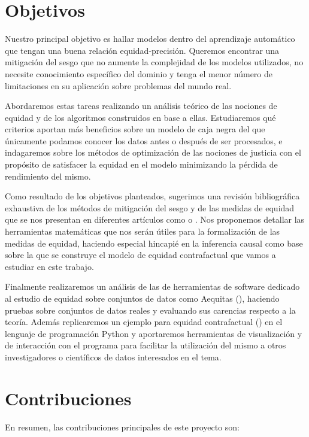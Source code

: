 \documentclass[oneside,openright,titlepage,numbers=noenddot,openany,headinclude,footinclude=true,
cleardoublepage=empty,abstractoff,BCOR=5mm,paper=a4,fontsize=12pt,main=spanish]{scrreprt}
\begin{document}
\section{Objetivos}

Nuestro principal objetivo es hallar modelos dentro del aprendizaje automático que tengan una buena relación equidad-precisión. Queremos encontrar una mitigación del sesgo que no aumente la complejidad de los modelos utilizados, no necesite conocimiento específico del dominio y tenga el menor número de limitaciones en su aplicación sobre problemas del mundo real.

Abordaremos estas tareas realizando un análisis teórico de las nociones de equidad y de los algoritmos construidos en base a ellas. Estudiaremos qué criterios aportan más beneficios sobre un modelo de caja negra del que únicamente podamos conocer los datos antes o después de ser procesados, e indagaremos sobre los métodos de optimización de las nociones de justicia con el propósito de satisfacer la equidad en el modelo minimizando la pérdida de rendimiento del mismo.

Como resultado de los objetivos planteados, sugerimos una revisión bibliográfica exhaustiva
de los métodos de mitigación del sesgo y de las medidas de equidad que se nos presentan en diferentes artículos como \cite{formalizing2018} o \cite{definitions2018}. Nos proponemos detallar las herramientas matemáticas que nos serán útiles para la formalización de las medidas de equidad, haciendo especial hincapié en la inferencia causal como base sobre la que se construye el modelo de equidad contrafactual que vamos a estudiar en este trabajo.

Finalmente realizaremos un análisis de las de herramientas de software dedicado al estudio de equidad sobre conjuntos de datos como Aequitas (\cite{aequitas2019}), haciendo pruebas sobre conjuntos de datos reales y evaluando sus carencias respecto a la teoría. Además replicaremos un ejemplo para equidad contrafactual (\cite{counterfactual2018}) en el lenguaje de programación Python y aportaremos herramientas de visualización y de interacción con el programa para facilitar la utilización del mismo a otros investigadores o científicos de datos interesados en el tema.

\section{Contribuciones}

En resumen, las contribuciones principales de este proyecto son:
\end{document}
